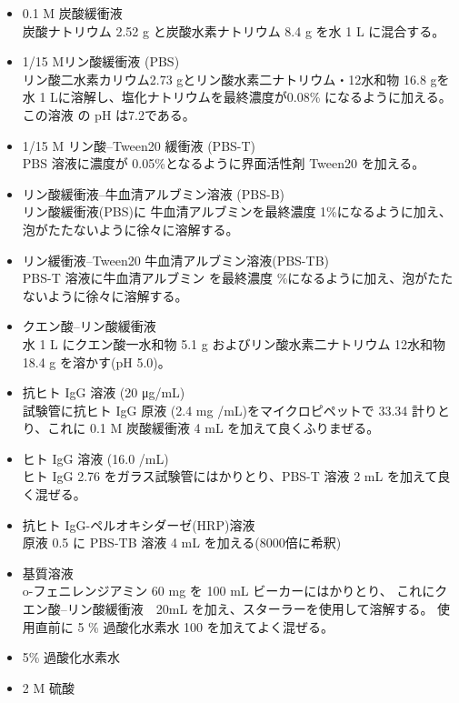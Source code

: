 \documentclass[a4paper]{ltjsarticle}
\begin{document}
\begin{itemize}
    \setlength\parskip{1em}
    \item 0.1 M 炭酸緩衝液 \\
    炭酸ナトリウム 2.52 g と炭酸水素ナトリウム 8.4 g を水 1 L に混合する。

    \item 1/15 Mリン酸緩衝液 (PBS) \\
    リン酸二水素カリウム2.73 gとリン酸水素二ナトリウム・12水和物
    16.8 gを水 1 Lに溶解し、塩化ナトリウムを最終濃度が0.08\% になるように加える。この溶液
    の pH は7.2である。

    \item 1/15 M リン酸--Tween20 緩衝液 (PBS-T) \\
    PBS 溶液に濃度が 0.05\%となるように界面活性剤 Tween20 を加える。

    \item リン酸緩衝液--牛血清アルブミン溶液 (PBS-B) \\
    リン酸緩衝液(PBS)に
    牛血清アルブミンを最終濃度 1\%になるように加え、泡がたたないように徐々に溶解する。

    \item リン緩衝液--Tween20 牛血清アルブミン溶液(PBS-TB) \\
    PBS-T 溶液に牛血清アルブミン
    を最終濃度 \%になるように加え、泡がたたないように徐々に溶解する。

    \item クエン酸--リン酸緩衝液 \\
    水 1 L にクエン酸一水和物 5.1 g およびリン酸水素二ナトリウム
    12水和物 18.4 g を溶かす(pH 5.0)。

    \item 抗ヒト IgG 溶液 (20 \si{\micro g/mL}) \\
    試験管に抗ヒト IgG 原液 (2.4 mg /mL)をマイクロピペットで
    33.34 \uL 計りとり、これに 0.1 M 炭酸緩衝液 4 mL を加えて良くふりまぜる。

    \item ヒト IgG 溶液 (16.0 \ug/mL) \\
    ヒト IgG 2.76 \uL をガラス試験管にはかりとり、PBS-T 溶液 2 mL を加えて良く混ぜる。

    \item 抗ヒト IgG-ペルオキシダーゼ(HRP)溶液 \\
    原液 0.5 \uL に PBS-TB 溶液 4 mL を加える(8000倍に希釈)

    \item 基質溶液 \\
    o-フェニレンジアミン 60 mg を 100 mL ビーカーにはかりとり、
    これにクエン酸--リン酸緩衝液　20mL を加え、スターラーを使用して溶解する。
    使用直前に 5 \% 過酸化水素水 100 \uL を加えてよく混ぜる。

    \item 5\% 過酸化水素水
    \item 2 M 硫酸
\end{itemize}
\end{document}
